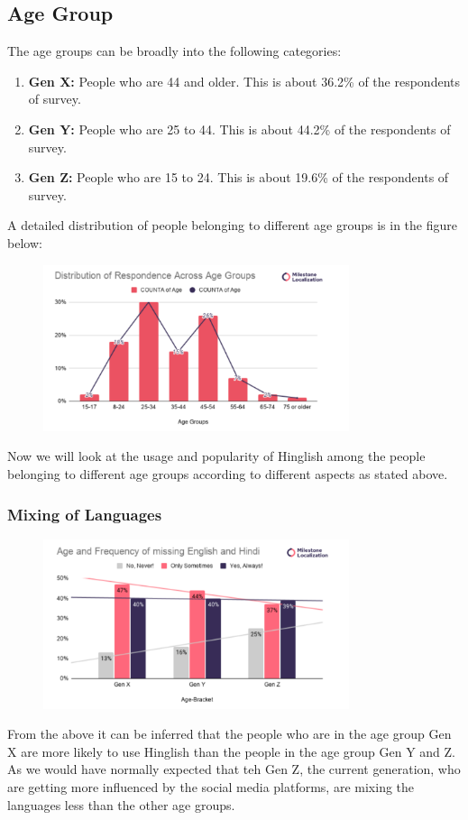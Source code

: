 \documentclass{article}
\begin{document}
\subsection{Age Group}
The age groups can be broadly into the following categories:
\begin{enumerate}
    \item \textbf{Gen X:} People who are 44 and older. This is about 36.2\% of the respondents of survey.
    \item \textbf{Gen Y:} People who are 25 to 44. This is about 44.2\% of the respondents of survey.
    \item \textbf{Gen Z:} People who are 15 to 24. This is about 19.6\% of the respondents of survey.
\end{enumerate}
A detailed distribution of people belonging to different age groups is in the figure below:
\begin{figure}[H]
    \centering
    \includegraphics[width=0.8\textwidth]{plots/distribution_with_age.png}
\end{figure}

Now we will look at the usage and popularity of Hinglish among the people belonging to different age groups according to different aspects as stated above.

\subsubsection{Mixing of Languages}

\begin{figure}[H]
    \centering
    \includegraphics[width=0.8\textwidth]{plots/age_mixing_language.png}
\end{figure}
From the above it can be inferred that the people who are in the age group Gen X are more likely to use Hinglish than the people in the age group Gen Y and Z. As we would have normally expected that teh Gen Z, the current generation, who are getting more influenced by the social media platforms, are mixing the languages less than the other age groups. 
\end{document}
